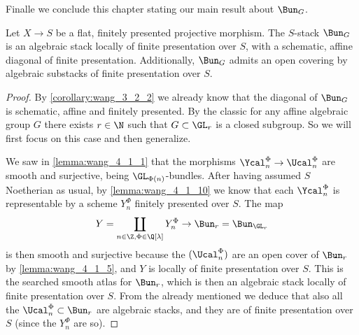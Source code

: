         Finalle we conclude this chapter stating our main result about $\Bun_G$.
        \begin{thm}
            \label{thm:bung_structure}
            Let $X \to S$ be a flat, finitely presented projective morphism. The $S$-stack $\Bun_G$ is an algebraic stack locally of finite presentation over $S$, with a schematic, affine diagonal of finite presentation. Additionally, $\Bun_G$ admits an open covering by algebraic substacks of finite presentation over $S$.
        \end{thm}
        \begin{proof}
            By \cref{corollary:wang_3_2_2} we already know that the diagonal of $\Bun_G$ is schematic, affine and finitely presented. By the classic \cite[2, Theorem~3.3]{dg70} for any affine algebraic group $G$ there exists $r \in \N$ such that $G \subset \GL_r$ is a closed subgroup. So we will first focus on this case and then generalize.

            We saw in \cref{lemma:wang_4_1_1} that the morphisms $\Ycal_n^{\Phi} \to \Ucal_n^{\Phi}$ are smooth and surjective, being $\GL_{\Phi(n)}$-bundles. After having assumed $S$ Noetherian as usual, by \cref{lemma:wang_4_1_10} we know that each $\Ycal_n^{\Phi}$ is representable by a scheme $Y_n^{\Phi}$ finitely presented over $S$. The map \[Y = \coprod_{n \in \Z, \Phi \in \Q[\lambda]} Y_n^{\Phi} \to \Bun_r = \Bun_{\GL_r} \] is then smooth and surjective because the $(\Ucal_n^{\Phi})$ are an open cover of $\Bun_r$ by \cref{lemma:wang_4_1_5}, and $Y$ is locally of finite presentation over $S$. This is the searched smooth atlas for $\Bun_r$, which is then an algebraic stack locally of finite presentation over $S$. From the already mentioned \cite[\href{https://stacks.math.columbia.edu/tag/05UN}{Lemma~05UN}]{stacks-project} we deduce that also all the $\Ucal_n^{\Phi} \subset \Bun_r$ are algebraic stacks, and they are of finite presentation over $S$ (since the $Y_n^{\Phi}$ are so).


\end{proof}
